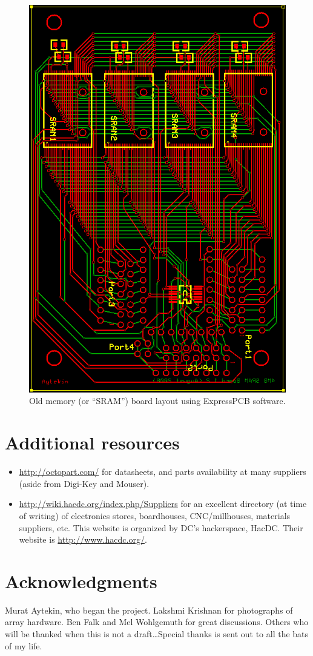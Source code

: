 \documentclass[letterpaper]{article}
\begin{document}
\begin{figure}
\centering
\includegraphics[height=\textheight]{figures/old_mem_layout.png}
\caption[Old memory board layout using ExpressPCB]{Old memory (or
  ``SRAM'') board layout using ExpressPCB software.}
\label{oldmem_layout:fig}
\end{figure}

\section{Additional resources}
\begin{itemize}
\item \url{http://octopart.com/} for datasheets, and parts
  availability at many suppliers (aside from Digi-Key and Mouser).

\item \url{http://wiki.hacdc.org/index.php/Suppliers} for an excellent
  directory (at time of writing) of electronics stores, boardhouses,
  CNC/millhouses, materials suppliers, etc. This website is organized
  by DC's hackerspace, HacDC. Their website is
  \url{http://www.hacdc.org/}.
\end{itemize}

\section*{Acknowledgments}

Murat Aytekin, who began the project.  Lakshmi Krishnan for
photographs of array hardware.  Ben Falk and Mel Wohlgemuth for great
discussions.  Others who will be thanked when this is not a
draft\ldots Special thanks is sent out to all the bats of my life.
\end{document}
